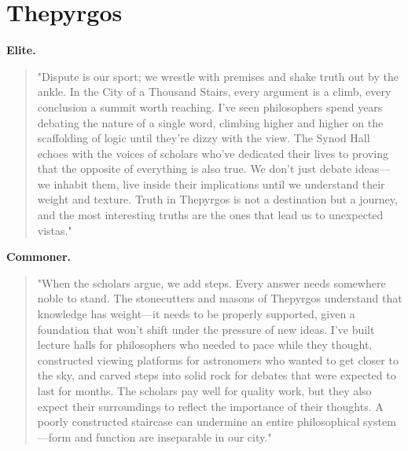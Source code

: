 \section*{Thepyrgos}
\textbf{Elite.}
\begin{quote}
"Dispute is our sport; we wrestle with premises and shake truth out by the ankle. In the City of a Thousand Stairs, every argument is a climb, every conclusion a summit worth reaching. I've seen philosophers spend years debating the nature of a single word, climbing higher and higher on the scaffolding of logic until they're dizzy with the view. The Synod Hall echoes with the voices of scholars who've dedicated their lives to proving that the opposite of everything is also true. We don't just debate ideas—we inhabit them, live inside their implications until we understand their weight and texture. Truth in Thepyrgos is not a destination but a journey, and the most interesting truths are the ones that lead us to unexpected vistas."
\end{quote}
\textbf{Commoner.}
\begin{quote}
"When the scholars argue, we add steps. Every answer needs somewhere noble to stand. The stonecutters and masons of Thepyrgos understand that knowledge has weight—it needs to be properly supported, given a foundation that won't shift under the pressure of new ideas. I've built lecture halls for philosophers who needed to pace while they thought, constructed viewing platforms for astronomers who wanted to get closer to the sky, and carved steps into solid rock for debates that were expected to last for months. The scholars pay well for quality work, but they also expect their surroundings to reflect the importance of their thoughts. A poorly constructed staircase can undermine an entire philosophical system—form and function are inseparable in our city."
\end{quote}

